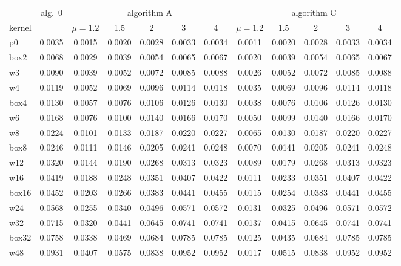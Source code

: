\documentclass{article}
\numberwithin{equation}{section}   %
\begin{document}
\begin{table}[ht]
\centering\small
{\setlength{\tabcolsep}{4pt}
\begin{tabular}{l c ccccc ccccc}
\toprule
 & alg.\ 0 & \multicolumn{5}{c}{algorithm A} & \multicolumn{5}{c}{algorithm C} \\
\cmidrule(lr){3-7}\cmidrule(lr){8-12}
kernel & & $\mu = 1.2$ & 1.5 & 2 & 3 & 4 & $\mu = 1.2$ & 1.5 & 2 & 3 & 4 \\
\midrule
p0    & 0.0035 & 0.0015 & 0.0020 & 0.0028 & 0.0033 & 0.0034 & 0.0011 & 0.0020 & 0.0028 & 0.0033 & 0.0034 \\
box2  & 0.0068 & 0.0029 & 0.0039 & 0.0054 & 0.0065 & 0.0067 & 0.0020 & 0.0039 & 0.0054 & 0.0065 & 0.0067 \\
w3    & 0.0090 & 0.0039 & 0.0052 & 0.0072 & 0.0085 & 0.0088 & 0.0026 & 0.0052 & 0.0072 & 0.0085 & 0.0088 \\
w4    & 0.0119 & 0.0052 & 0.0069 & 0.0096 & 0.0114 & 0.0118 & 0.0035 & 0.0069 & 0.0096 & 0.0114 & 0.0118 \\
box4  & 0.0130 & 0.0057 & 0.0076 & 0.0106 & 0.0126 & 0.0130 & 0.0038 & 0.0076 & 0.0106 & 0.0126 & 0.0130 \\
w6    & 0.0168 & 0.0076 & 0.0100 & 0.0140 & 0.0166 & 0.0170 & 0.0050 & 0.0099 & 0.0140 & 0.0166 & 0.0170 \\
w8    & 0.0224 & 0.0101 & 0.0133 & 0.0187 & 0.0220 & 0.0227 & 0.0065 & 0.0130 & 0.0187 & 0.0220 & 0.0227 \\
box8  & 0.0246 & 0.0111 & 0.0146 & 0.0205 & 0.0241 & 0.0248 & 0.0070 & 0.0141 & 0.0205 & 0.0241 & 0.0248 \\
w12   & 0.0320 & 0.0144 & 0.0190 & 0.0268 & 0.0313 & 0.0323 & 0.0089 & 0.0179 & 0.0268 & 0.0313 & 0.0323 \\
w16   & 0.0419 & 0.0188 & 0.0248 & 0.0351 & 0.0407 & 0.0422 & 0.0111 & 0.0233 & 0.0351 & 0.0407 & 0.0422 \\
box16 & 0.0452 & 0.0203 & 0.0266 & 0.0383 & 0.0441 & 0.0455 & 0.0115 & 0.0254 & 0.0383 & 0.0441 & 0.0455 \\
w24   & 0.0568 & 0.0255 & 0.0340 & 0.0496 & 0.0571 & 0.0572 & 0.0131 & 0.0325 & 0.0496 & 0.0571 & 0.0572 \\
w32   & 0.0715 & 0.0320 & 0.0441 & 0.0645 & 0.0741 & 0.0741 & 0.0137 & 0.0415 & 0.0645 & 0.0741 & 0.0741 \\
box32 & 0.0758 & 0.0338 & 0.0469 & 0.0684 & 0.0785 & 0.0785 & 0.0125 & 0.0435 & 0.0684 & 0.0785 & 0.0785 \\
w48   & 0.0931 & 0.0407 & 0.0575 & 0.0838 & 0.0952 & 0.0952 & 0.0117 & 0.0515 & 0.0838 & 0.0952 & 0.0952 \\

\end{tabular}}
\end{table}
\end{document}
